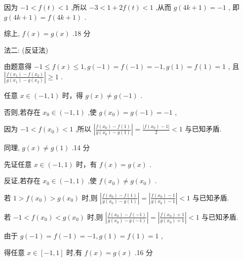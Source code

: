 \documentclass[10pt]{article}
\newcommand*\circled[1]{\tikz[baseline=(char.base)]{\node[shape=circle,draw,inner sep=1.5pt] (char) {\small #1};}}
\begin{document}
因为 \(- 1 < f\left( t\right)  < 1\) ,所以 \(- 3 < 1 + {2f}\left( t\right)  < 1\) ,从而 \(g\left( {{4k} + 1}\right)  =  - 1\) , 即 \(g\left( {{4k} + 1}\right)  = f\left( {{4k} + 1}\right)\) .

综上, \(f\left( x\right)  = g\left( x\right)\) .18 分

法二: (反证法)

由题意得 \(- 1 \leq  f\left( x\right)  \leq  1,g\left( {-1}\right)  = f\left( {-1}\right)  =  - 1,g\left( 1\right)  = f\left( 1\right)  = 1\) , 且 \(\left| \frac{f\left( {x}_{1}\right)  - f\left( {x}_{2}\right) }{g\left( {x}_{1}\right)  - g\left( {x}_{2}\right) }\right|  \geq  1\) .

 \circled{1} 任意 \(x \in  \left( {-1,1}\right)\) 时，得 \(g\left( x\right)  \neq  g\left( {-1}\right)\) .

否则,若存在 \({x}_{0} \in  \left( {-1,1}\right)\) ,使 \(g\left( {x}_{0}\right)  = g\left( {-1}\right)  =  - 1\) ,

因为 \(- 1 < f\left( {x}_{0}\right)  < 1\) ,所以 \(\left| \frac{f\left( {x}_{0}\right)  - f\left( 1\right) }{g\left( {x}_{0}\right)  - g\left( 1\right) }\right|  = \frac{\left| f\left( {x}_{0}\right)  - 1\right| }{2} < 1\) 与已知矛盾.

同理, \(g\left( x\right)  \neq  g\left( 1\right)\) .14 分

 \circled{2} 先证任意 \(x \in  \left( {-1,1}\right)\) 时，有 \(f\left( x\right)  = g\left( x\right)\) .

反证,若存在 \({x}_{0} \in  \left( {-1,1}\right)\) ,使 \(f\left( {x}_{0}\right)  \neq  g\left( {x}_{0}\right)\) .

若 \(1 > f\left( {x}_{0}\right)  > g\left( {x}_{0}\right)\) 时,则 \(\left| \frac{f\left( {x}_{0}\right)  - f\left( 1\right) }{g\left( {x}_{0}\right)  - g\left( 1\right) }\right|  = \left| \frac{f\left( {x}_{0}\right)  - 1}{g\left( {x}_{0}\right)  - 1}\right|  < 1\) 与已知矛盾.

若 \(- 1 < f\left( {x}_{0}\right)  < g\left( {x}_{0}\right)\) 时,则 \(\left| \frac{f\left( {x}_{0}\right)  - f\left( {-1}\right) }{g\left( {x}_{0}\right)  - g\left( {-1}\right) }\right|  = \left| \frac{f\left( {x}_{0}\right)  + 1}{g\left( {x}_{0}\right)  + 1}\right|  < 1\) 与已知矛盾.

由于 \(g\left( {-1}\right)  = f\left( {-1}\right)  =  - 1,g\left( 1\right)  = f\left( 1\right)  = 1\) ,

得任意 \(x \in  \left\lbrack  {-1,1}\right\rbrack\) 时,有 \(f\left( x\right)  = g\left( x\right)\) .16 分
\end{document}
